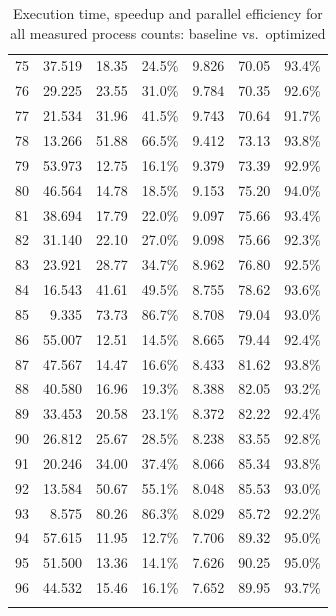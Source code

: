 \begin{longtable}{rrrrrrr}
    75 & 37.519 & 18.35 & 24.5\% & 9.826 & 70.05 & 93.4\% \\
    76 & 29.225 & 23.55 & 31.0\% & 9.784 & 70.35 & 92.6\% \\
    77 & 21.534 & 31.96 & 41.5\% & 9.743 & 70.64 & 91.7\% \\
    78 & 13.266 & 51.88 & 66.5\% & 9.412 & 73.13 & 93.8\% \\
    79 & 53.973 & 12.75 & 16.1\% & 9.379 & 73.39 & 92.9\% \\
    80 & 46.564 & 14.78 & 18.5\% & 9.153 & 75.20 & 94.0\% \\
    81 & 38.694 & 17.79 & 22.0\% & 9.097 & 75.66 & 93.4\% \\
    82 & 31.140 & 22.10 & 27.0\% & 9.098 & 75.66 & 92.3\% \\
    83 & 23.921 & 28.77 & 34.7\% & 8.962 & 76.80 & 92.5\% \\
    84 & 16.543 & 41.61 & 49.5\% & 8.755 & 78.62 & 93.6\% \\
    85 & 9.335 & 73.73 & 86.7\% & 8.708 & 79.04 & 93.0\% \\
    86 & 55.007 & 12.51 & 14.5\% & 8.665 & 79.44 & 92.4\% \\
    87 & 47.567 & 14.47 & 16.6\% & 8.433 & 81.62 & 93.8\% \\
    88 & 40.580 & 16.96 & 19.3\% & 8.388 & 82.05 & 93.2\% \\
    89 & 33.453 & 20.58 & 23.1\% & 8.372 & 82.22 & 92.4\% \\
    90 & 26.812 & 25.67 & 28.5\% & 8.238 & 83.55 & 92.8\% \\
    91 & 20.246 & 34.00 & 37.4\% & 8.066 & 85.34 & 93.8\% \\
    92 & 13.584 & 50.67 & 55.1\% & 8.048 & 85.53 & 93.0\% \\
    93 & 8.575 & 80.26 & 86.3\% & 8.029 & 85.72 & 92.2\% \\
    94 & 57.615 & 11.95 & 12.7\% & 7.706 & 89.32 & 95.0\% \\
    95 & 51.500 & 13.36 & 14.1\% & 7.626 & 90.25 & 95.0\% \\
    96 & 44.532 & 15.46 & 16.1\% & 7.652 & 89.95 & 93.7\% \\
    \bottomrule
    \caption{Execution time, speedup and parallel efficiency for all measured process counts: baseline vs.\ optimized}
    \label{tab:strong-scaling-full}
\end{longtable}
